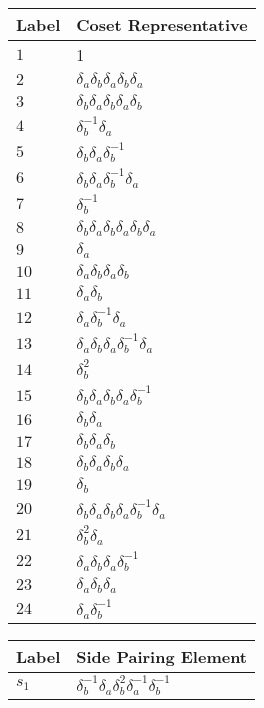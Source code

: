 \documentclass{article}
\begin{document}
\begin{center}
\begin{tabular}{ll}
\toprule
Label & Coset Representative\\
\midrule
$1$ & 1 \\
$2$ & $\delta_a^{}\delta_b^{}\delta_a^{}\delta_b^{}\delta_a^{}$ \\
$3$ & $\delta_b^{}\delta_a^{}\delta_b^{}\delta_a^{}\delta_b^{}$ \\
$4$ & $\delta_b^{-1}\delta_a^{}$ \\
$5$ & $\delta_b^{}\delta_a^{}\delta_b^{-1}$ \\
$6$ & $\delta_b^{}\delta_a^{}\delta_b^{-1}\delta_a^{}$ \\
$7$ & $\delta_b^{-1}$ \\
$8$ & $\delta_b^{}\delta_a^{}\delta_b^{}\delta_a^{}\delta_b^{}\delta_a^{}$ \\
$9$ & $\delta_a^{}$ \\
$10$ & $\delta_a^{}\delta_b^{}\delta_a^{}\delta_b^{}$ \\
$11$ & $\delta_a^{}\delta_b^{}$ \\
$12$ & $\delta_a^{}\delta_b^{-1}\delta_a^{}$ \\
$13$ & $\delta_a^{}\delta_b^{}\delta_a^{}\delta_b^{-1}\delta_a^{}$ \\
$14$ & $\delta_b^{2}$ \\
$15$ & $\delta_b^{}\delta_a^{}\delta_b^{}\delta_a^{}\delta_b^{-1}$ \\
$16$ & $\delta_b^{}\delta_a^{}$ \\
$17$ & $\delta_b^{}\delta_a^{}\delta_b^{}$ \\
$18$ & $\delta_b^{}\delta_a^{}\delta_b^{}\delta_a^{}$ \\
$19$ & $\delta_b^{}$ \\
$20$ & $\delta_b^{}\delta_a^{}\delta_b^{}\delta_a^{}\delta_b^{-1}\delta_a^{}$ \\
$21$ & $\delta_b^{2}\delta_a^{}$ \\
$22$ & $\delta_a^{}\delta_b^{}\delta_a^{}\delta_b^{-1}$ \\
$23$ & $\delta_a^{}\delta_b^{}\delta_a^{}$ \\
$24$ & $\delta_a^{}\delta_b^{-1}$ \\
\bottomrule
\end{tabular}
\hfill
\begin{tabular}{ll}
\toprule
Label & Side Pairing Element\\
\midrule
$s_{1}$ & $\delta_b^{-1}\delta_a^{}\delta_b^{2}\delta_a^{-1}\delta_b^{-1}$ \\

\end{tabular}
\end{center}
\end{document}
